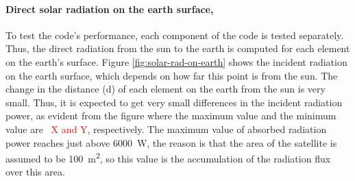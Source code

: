 \documentclass[11pt]{article}
\begin{document}
\paragraph{Direct solar radiation on the earth surface,} To test the code's performance, each component of the code is tested separately. Thus, the direct radiation from the sun to the earth is computed for each element on the earth's surface. Figure \ref{fig:solar-rad-on-earth} shows the incident radiation on the earth surface, which depends on how far this point is from the sun. The change in the distance (d) of each element on the earth from the sun is very small. Thus, it is expected to get very small differences in the incident radiation power, as evident from the figure where the maximum value and the minimum value are~\textcolor{red}{ X and Y}, respectively. The maximum value of absorbed radiation power reaches just above \SI{6000}{\watt}, the reason is that the area of the satellite is assumed to be \SI{100}{\meter\squared}, so this value is the accumulation of the radiation flux over this area. 
\end{document}
